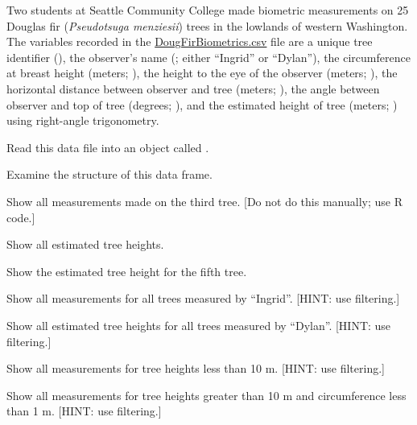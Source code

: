 \documentclass[10pt,openany]{book}\usepackage[]{graphicx}\usepackage[]{color}
\begin{document}
\newpage
\begin{exsection}
  \item \label{revex:BasicsDataFrame1} \rhw{} Two students at Seattle Community College made biometric measurements on 25 Douglas fir (\emph{Pseudotsuga menziesii}) trees in the lowlands of western Washington.  The variables recorded in the \href{https://raw.githubusercontent.com/droglenc/NCData/master/DougFirBiometrics.csv}{DougFirBiometrics.csv} file are a unique tree identifier (), the observer's name (; either ``Ingrid'' or ``Dylan''), the circumference at breast height (meters; ), the height to the eye of the observer (meters; ), the horizontal distance between observer and tree (meters; ), the angle between observer and top of tree (degrees; ), and the estimated height of tree (meters; ) using right-angle trigonometry. 
  \begin{Enumerate}
    \item Read this data file into an object called .
    \item Examine the structure of this data frame.
    \item Show all measurements made on the third tree. [Do not do this manually; use R code.]
    \item Show all estimated tree heights.
    \item Show the estimated tree height for the fifth tree.
    \item Show all measurements for all trees measured by ``Ingrid''.  [HINT: use filtering.]
    \item Show all estimated tree heights for all trees measured by ``Dylan''.  [HINT: use filtering.]
    \item Show all measurements for tree heights less than 10 m.  [HINT: use filtering.]
    \item Show all measurements for tree heights greater than 10 m and circumference less than 1 m.  [HINT: use filtering.]
  \end{Enumerate}
\end{exsection}
\end{document}

